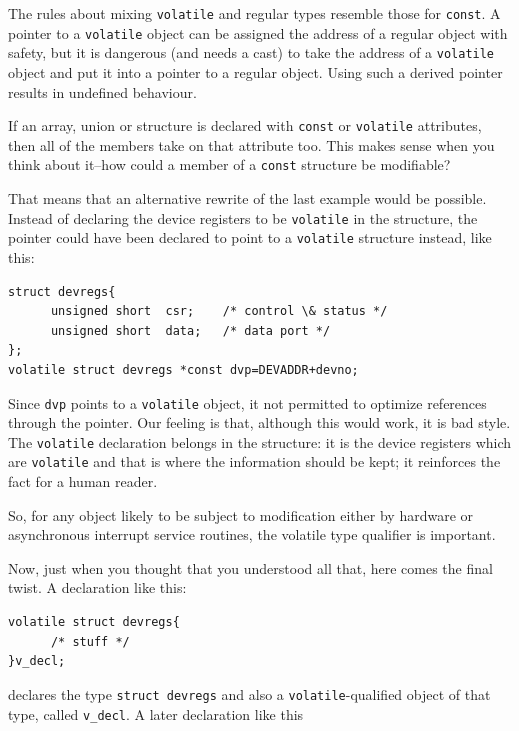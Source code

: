    The rules about mixing \texttt{volatile} and regular types
    resemble those for \texttt{const}. A pointer to
    a \texttt{volatile} object can be assigned the address of a regular
    object with safety, but it is dangerous (and needs a cast) to take the
    address of a \texttt{volatile} object and put it into a pointer to
    a regular object. Using such a derived pointer results in undefined
    behaviour.


   If an array, union or structure is declared with \texttt{const} or
    \texttt{volatile} attributes, then all of the members take on that
    attribute too. This makes sense when you think about it--how could
    a member of a \texttt{const} structure be modifiable?


   That means that an alternative rewrite of the last example would be
    possible. Instead of declaring the device registers to be
    \texttt{volatile} in the structure, the pointer could have been
    declared to point to a \texttt{volatile} structure instead, like
    this:


\begin{Verbatim}
struct devregs{
      unsigned short  csr;    /* control \& status */
      unsigned short  data;   /* data port */
};
volatile struct devregs *const dvp=DEVADDR+devno;
\end{Verbatim}

   Since \texttt{dvp} points to a \texttt{volatile} object, it
    not permitted to optimize references through the pointer. Our feeling is
    that, although this would work, it is bad style. The
    \texttt{volatile} declaration belongs in the structure: it is the
    device registers which are \texttt{volatile} and that is where the
    information should be kept; it reinforces the fact for a human
    reader.


   So, for any object likely to be subject to modification either by
    hardware or asynchronous interrupt service routines, the volatile type
    qualifier is important.


   Now, just when you thought that you understood all that, here comes
    the final twist. A declaration like this:


\begin{Verbatim}
volatile struct devregs{
      /* stuff */
}v_decl;
\end{Verbatim}

   declares the type \texttt{struct devregs} and also
    a \texttt{volatile}-qualified object of that type, called
    \texttt{v\_decl}. A later declaration like this


